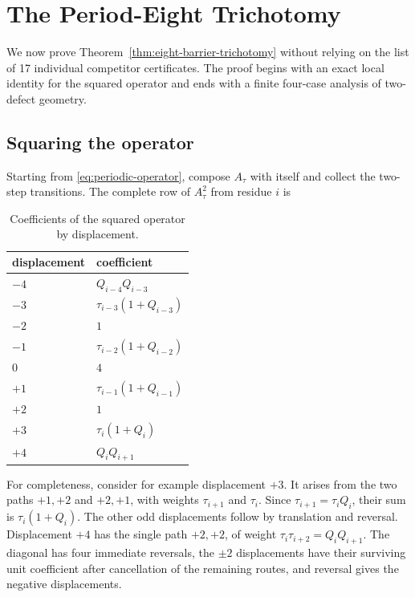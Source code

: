 \section{The Period-Eight Trichotomy}\label{sec:eight-barrier}

We now prove Theorem~\ref{thm:eight-barrier-trichotomy} without relying on the list of 17 individual
competitor certificates. The proof begins with an exact local identity for the
squared operator and ends with a finite four-case analysis of two-defect
geometry.

\subsection{Squaring the operator}

Starting from \eqref{eq:periodic-operator}, compose \(A_\tau\) with itself and
collect the two-step transitions. The complete row of \(A_\tau^{2}\) from
residue \(i\) is

\begin{table}[tbp]
\centering
\caption{Coefficients of the squared operator by displacement.}
\label{tab:squared-operator-coefficients}
\begingroup
\renewcommand{\arraystretch}{1.12}
\begin{tabular}{ll}
\toprule
displacement & coefficient \\
\midrule
\(-4\) & \(Q_{i-4}Q_{i-3}\) \\
\(-3\) & \(\tau_{i-3}(1+Q_{i-3})\) \\
\(-2\) & \(1\) \\
\(-1\) & \(\tau_{i-2}(1+Q_{i-2})\) \\
\(0\) & \(4\) \\
\(+1\) & \(\tau_{i-1}(1+Q_{i-1})\) \\
\(+2\) & \(1\) \\
\(+3\) & \(\tau_i(1+Q_i)\) \\
\(+4\) & \(Q_iQ_{i+1}\) \\
\bottomrule
\end{tabular}
\endgroup
\end{table}

For completeness, consider for example displacement \(+3\). It arises from the
two paths \(+1,+2\) and \(+2,+1\), with weights \(\tau_{i+1}\) and \(\tau_i\).
Since \(\tau_{i+1}=\tau_i Q_i\), their sum is \(\tau_i(1+Q_i)\). The other odd
displacements follow by translation and reversal. Displacement \(+4\) has the
single path \(+2,+2\), of weight \(\tau_i \tau_{i+2}=Q_iQ_{i+1}\). The diagonal
has four immediate reversals, the \(\pm2\) displacements have their surviving
unit coefficient after cancellation of the remaining routes, and reversal
gives the negative displacements.

